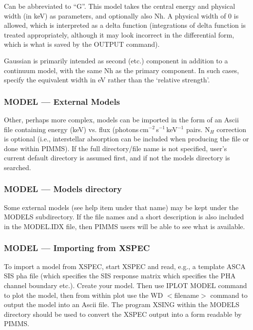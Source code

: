 Can be abbreviated to ``G''.  This model takes the central energy and physical
width (in keV) as parameters, and optionally also Nh.  A physical width of 0
is allowed, which is interpreted as a delta function (integrations of delta
function is treated appropriately, although it may look incorrect in the
differential form, which is what is saved by the OUTPUT command).

Gaussian is primarily intended as second (etc.) component in addition to a
continuum model, with the same Nh as the primary component.  In such cases,
specify the equivalent width in eV rather than the `relative strength'.

\subsubsection*{MODEL --- External Models}

Other, perhaps more complex, models can be  imported in the form of an Ascii
file containing energy  (keV) vs. flux (photons\,cm$^{-2}$\,s$^{-1}$\,keV$^{-1}$
pairs.    N$_H$
correction is  optional  (i.e., interstellar absorption can be included when
producing the file or done within PIMMS). If the full directory/file name is
not specified, user's current default directory is assumed first, and if not
the models directory is searched.

\subsubsection*{MODEL --- Models directory}

Some external models (see help item under that name) may be kept under the
MODELS subdirectory.   If the file names  and a short description  is also
included in the MODEL.IDX file,  then PIMMS users will be able to see what
is available.

\subsubsection*{MODEL --- Importing from XSPEC}

To import a model from XSPEC, start XSPEC and read, e.g., a template ASCA
SIS pha file (which specifies the SIS response matrix which specifies the
PHA channel  boundary etc.).    Create your model.   Then use IPLOT MODEL
command to plot  the model,  then from within plot  use the WD $<$filename$>$
command to output the model into an Ascii file.  The program XSING within
the MODELS directory  should be used  to convert the  XSPEC output into a
form readable by PIMMS.


